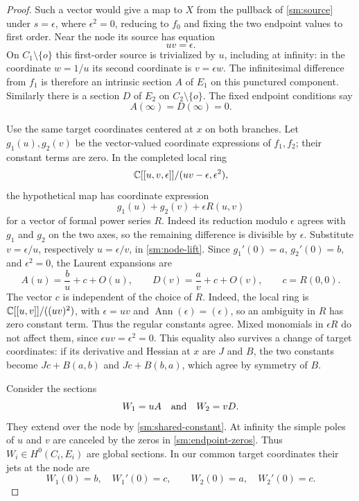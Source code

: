 \begin{proof}
Such a vector would give a map to $X$ from the pullback of
\eqref{sm:source} under $s=\epsilon$, where
$\epsilon^2=0$, reducing to $f_0$ and fixing the two endpoint
values to first order. Near the node its source has equation
\[
uv=\epsilon.
\]
On $C_1\setminus\{o\}$ this first-order source is trivialized
by $u$, including at infinity: in the coordinate $w=1/u$ its
second coordinate is $v=\epsilon w$.
The infinitesimal difference from $f_1$ is therefore an
intrinsic section $A$ of $E_1$ on this punctured component.
Similarly there is a section $D$ of $E_2$ on
$C_2\setminus\{o\}$. The fixed endpoint conditions say
\begin{equation}\label{sm:endpoint-zeros}
A(\infty)=D(\infty)=0.
\end{equation}

Use the same target coordinates centered at $x$ on both
branches. Let $g_1(u),g_2(v)$ be the vector-valued coordinate
expressions of $f_1,f_2$; their constant terms are zero.
In the completed local ring
\[
\mathbb C[[u,v,\epsilon]]/(uv-\epsilon,\epsilon^2),
\]
the hypothetical map has coordinate expression
\begin{equation}\label{sm:node-lift}
g_1(u)+g_2(v)+\epsilon R(u,v)
\end{equation}
for a vector of formal power series $R$.
Indeed its reduction modulo $\epsilon$ agrees with $g_1$
and $g_2$ on the two axes, so the remaining difference is
divisible by $\epsilon$.
Substitute $v=\epsilon/u$, respectively $u=\epsilon/v$,
in \eqref{sm:node-lift}. Since $g_1'(0)=a$, $g_2'(0)=b$,
and $\epsilon^2=0$, the Laurent expansions are
\begin{equation}\label{sm:shared-constant}
A(u)=\frac b u+c+O(u),\qquad
D(v)=\frac a v+c+O(v),\qquad c=R(0,0).
\end{equation}
The vector $c$ is independent of the choice of $R$. Indeed, the
local ring is $\mathbb C[[u,v]]/((uv)^2)$, with $\epsilon=uv$ and
$\operatorname{Ann}(\epsilon)=(\epsilon)$, so an ambiguity in $R$
has zero constant term. Thus the regular constants agree.
Mixed monomials in $\epsilon R$ do not affect them, since
$\epsilon uv=\epsilon^2=0$.
This equality also survives a change of target coordinates:
if its derivative and Hessian at $x$ are $J$ and $B$, the two
constants become $Jc+B(a,b)$ and $Jc+B(b,a)$, which agree
by symmetry of $B$.

Consider the sections
\[
W_1=uA\quad\hbox{and}\quad W_2=vD.
\]
They extend over the node by \eqref{sm:shared-constant}.
At infinity the simple poles of $u$ and $v$ are canceled by
the zeros in \eqref{sm:endpoint-zeros}. Thus
$W_i\in H^0(C_i,E_i)$ are global sections. In our common
target coordinates their jets at the node are
\begin{equation}\label{sm:auxiliary-jets}
W_1(0)=b,\quad W_1'(0)=c,\qquad
W_2(0)=a,\quad W_2'(0)=c.
\end{equation}


\end{proof}
